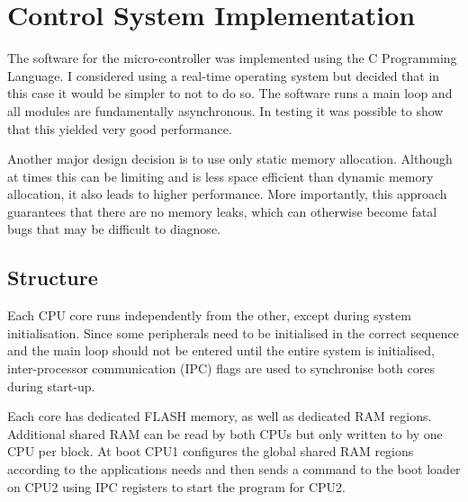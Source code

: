 
\chapter{Control System Implementation}

The software for the micro-controller was implemented using the C Programming Language. I considered using a real-time operating system but decided that in this case it would be simpler to not to do so. The software runs a main loop and all modules are fundamentally asynchronous. In testing it was possible to show that this yielded very good performance.

Another major design decision is to use only static memory allocation. Although at times this can be limiting and is less space efficient than dynamic memory allocation, it also leads to higher performance. More importantly, this approach guarantees that there are no memory leaks, which can otherwise become fatal bugs that may be difficult to diagnose.

\section{Structure}

Each CPU core runs independently from the other, except during system initialisation. Since some peripherals need to be initialised in the correct sequence and the main loop should not be entered until the entire system is initialised, inter-processor communication (IPC) flags are used to synchronise both cores during start-up.

Each core has dedicated FLASH memory, as well as dedicated RAM regions. Additional shared RAM can be read by both CPUs but only written to by one CPU per block. At boot CPU1 configures the global shared RAM regions according to the applications needs and then sends a command to the boot loader on CPU2 using IPC registers to start the program for CPU2.

